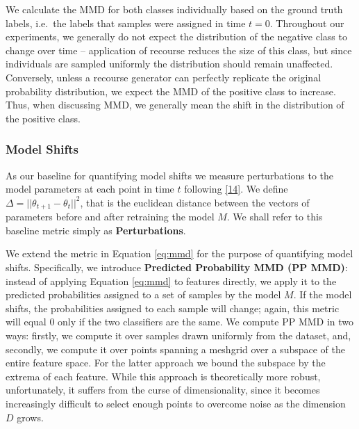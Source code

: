 \documentclass[conference,final,]{IEEEtran}
\begin{document}
We calculate the MMD for both classes individually based on the ground truth labels, i.e.~the labels that samples were assigned in time \(t=0\). Throughout our experiments, we generally do not expect the distribution of the negative class to change over time -- application of recourse reduces the size of this class, but since individuals are sampled uniformly the distribution should remain unaffected. Conversely, unless a recourse generator can perfectly replicate the original probability distribution, we expect the MMD of the positive class to increase. Thus, when discussing MMD, we generally mean the shift in the distribution of the positive class.

\hypertarget{model-shifts}{%
\subsubsection{Model Shifts}\label{model-shifts}}

As our baseline for quantifying model shifts we measure perturbations to the model parameters at each point in time \(t\) following \protect\hyperlink{ref-upadhyay2021towards}{{[}14{]}}. We define \(\Delta=||\theta_{t+1}-\theta_{t}||^2\), that is the euclidean distance between the vectors of parameters before and after retraining the model \(M\). We shall refer to this baseline metric simply as \textbf{Perturbations}.

We extend the metric in Equation \eqref{eq:mmd} for the purpose of quantifying model shifts. Specifically, we introduce \textbf{Predicted Probability MMD (PP MMD)}: instead of applying Equation \eqref{eq:mmd} to features directly, we apply it to the predicted probabilities assigned to a set of samples by the model \(M\). If the model shifts, the probabilities assigned to each sample will change; again, this metric will equal 0 only if the two classifiers are the same. We compute PP MMD in two ways: firstly, we compute it over samples drawn uniformly from the dataset, and, secondly, we compute it over points spanning a meshgrid over a subspace of the entire feature space. For the latter approach we bound the subspace by the extrema of each feature. While this approach is theoretically more robust, unfortunately, it suffers from the curse of dimensionality, since it becomes increasingly difficult to select enough points to overcome noise as the dimension \(D\) grows.
\end{document}
